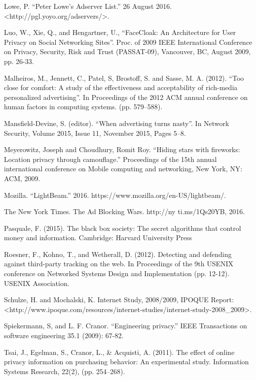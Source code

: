 \documentclass[conference]{IEEEtran}
\begin{document}
\begin{thebibliography}{99}
 Lowe, P. ``Peter Lowe's Adserver List.'' 26 August 2016. <http://pgl.yoyo.org/adservers/>.

 Luo, W., Xie, Q., and Hengartner, U., ``FaceCloak: An Architecture for User Privacy on Social Networking Sites''. Proc. of 2009 IEEE International Conference on Privacy, Security, Risk and Trust (PASSAT-09), Vancouver, BC, August 2009, pp. 26-33.

 Malheiros, M., Jennett, C., Patel, S, Brostoff, S. and Sasse, M. A. (2012). ``Too close for comfort: A study of the effectiveness and acceptability of rich-media personalized advertising''. In Proceedings of the 2012 ACM annual conference on human factors in computing systems. (pp. 579–588).

 Mansfield-Devine, S. (editor). ``When advertising turns nasty''. In Network Security, Volume 2015, Issue 11, November 2015, Pages 5–8.

 Meyerowitz, Joseph and Choudhury, Romit Roy. ``Hiding stars with fireworks: Location privacy through camouflage.'' Proceedings of the 15th annual international conference on Mobile computing and networking, New York, NY: ACM, 2009.

 Mozilla. ``LightBeam.'' 2016. https://www.mozilla.org/en-US/lightbeam/.

 The New York Times. The Ad Blocking Wars. http://ny ti.ms/1Qs20YB, 2016.

 Pasquale, F. (2015). The black box society: The secret algorithms that control money and information. Cambridge: Harvard University Press

 Roesner, F., Kohno, T., and Wetherall, D. (2012). Detecting and defending against third-party tracking on the web. In Proceedings of the 9th USENIX conference on Networked Systems Design and Implementation (pp. 12-12). USENIX Association.

 Schulze, H. and Mochalski, K. Internet Study, 2008/2009, IPOQUE Report:
<http://www.ipoque.com/resources/internet-studies/internet-study-2008\_2009>.

 Spiekermann, S, and L. F. Cranor. ``Engineering privacy.'' IEEE Transactions on software engineering 35.1 (2009): 67-82.

 Tsai, J., Egelman, S., Cranor, L., \& Acquisti, A. (2011). The effect of online privacy information on purchasing behavior: An experimental study. Information Systems Research, 22(2), (pp. 254–268).


\end{thebibliography}
\end{document}

